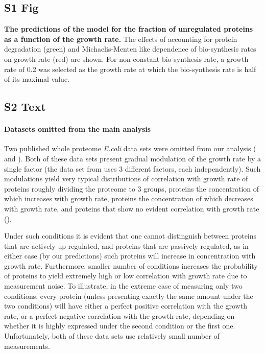 \documentclass[10pt,letterpaper]{article}
\begin{document}
\subsection*{S1 Fig}
\label{fig:theoreticalpred}
    {\bf The predictions of the model for the fraction of unregulated proteins as a function of the growth rate.}
The effects of accounting for protein degradation (green) and Michaelis-Menten like dependence of bio-synthesis rates on growth rate (red) are shown.
For non-constant bio-synthesis rate, a growth rate of 0.2 was selected as the growth rate at which the bio-synthesis rate is half of its maximal value.%

\subsection*{S2 Text}
\label{furtherdatasetanalysis}
\paragraph{Datasets omitted from the main analysis}
Two published whole proteome \emph{E.coli} data sets were omitted from our analysis (\cite{Valgepea2013} and \cite{Hui_2015}).
Both of these data sets present gradual modulation of the growth rate by a single factor (the data set from \cite{Hui_2015} uses 3 different factors, each independently).
Such modulations yield very typical distributions of correlation with growth rate of proteins roughly dividing the proteome to 3 groups, proteins the concentration of which increases with growth rate, proteins the concentration of which decreases with growth rate, and proteins that show no evident correlation with growth rate ().

Under such conditions it is evident that one cannot distinguish between proteins that are actively up-regulated, and proteins that are passively regulated, as in either case (by our predictions) such proteins will increase in concentration with growth rate.
Furthermore, smaller number of conditions increases the probability of proteins to yield extremely high or low correlation with growth rate due to measurement noise.
To illustrate, in the extreme case of measuring only two conditions, every protein (unless presenting exactly the same amount under the two conditions) will have either a perfect positive correlation with the growth rate, or a perfect negative correlation with the growth rate, depending on whether it is highly expressed under the second condition or the first one.
Unfortunately, both of these data sets use relatively small number of measurements.
\end{document}
